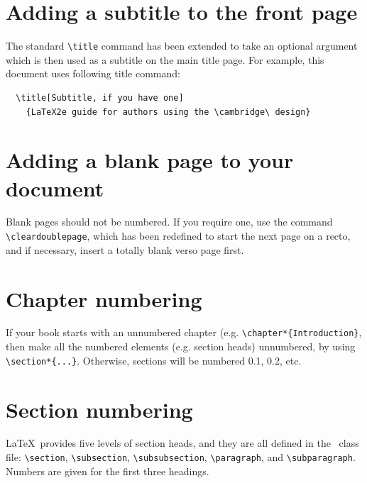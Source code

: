 \section{Adding a subtitle to the front page}

The standard \verb"\title" command has been extended to take an optional argument which is then used as a subtitle on the main title page. For example, this document uses following title command:
\begin{verbatim}
  \title[Subtitle, if you have one]
    {LaTeX2e guide for authors using the \cambridge\ design}
\end{verbatim}


\section{Adding a blank page to your document}

Blank pages should not be numbered. If you require one, use the command \verb"\cleardoublepage", which has been redefined to start the next page on a recto, and if necessary, insert a totally blank verso page first.


\section{Chapter numbering}
If your book starts with an unnumbered chapter (e.g. \verb"\chapter*{Introduction}", then make all the numbered elements (e.g. section heads) unnumbered, by using \verb"\section*{...}". Otherwise, sections will be numbered 0.1, 0.2, etc.

\section{Section numbering}

\LaTeX\ provides five levels of section heads, and they are all defined in the \cambridge\ class file: \verb"\section", \verb"\subsection", \verb"\subsubsection", \verb"\paragraph", and \verb"\subparagraph". Numbers are given for the first three headings.

